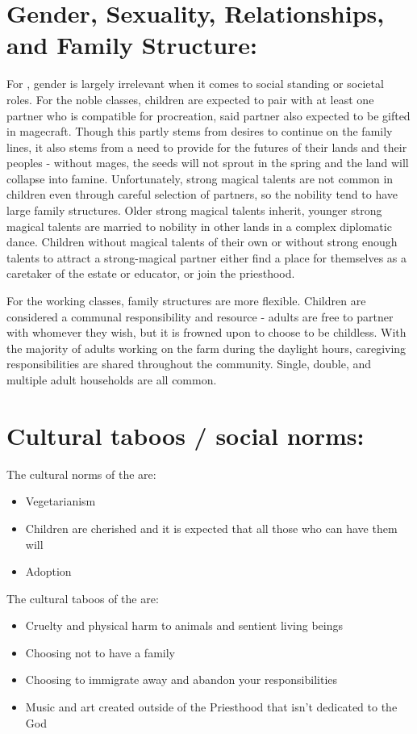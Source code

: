 \documentclass[blue]{GL2020}
\begin{document}
\section*{Gender, Sexuality, Relationships, and Family Structure:}

For \pFarm{}, gender is largely irrelevant when it comes to social standing or societal roles.  For the noble classes, children are expected to pair with at least one partner who is compatible for procreation, said partner also expected to be gifted in magecraft.  Though this partly stems from desires to continue on the family lines, it also stems from a need to provide for the futures of their lands and their peoples - without mages, the seeds will not sprout in the spring and the land will collapse into famine.  Unfortunately, strong magical talents are not common in children even through careful selection of partners, so the nobility tend to have large family structures.  Older strong magical talents inherit, younger strong magical talents are married to nobility in other lands in a complex diplomatic dance.  Children without magical talents of their own or without strong enough talents to attract a strong-magical partner either find a place for themselves as a caretaker of the estate or educator, or join the priesthood.

For the working classes, family structures are more flexible.  Children are considered a communal responsibility and resource - adults are free to partner with whomever they wish, but it is frowned upon to choose to be childless.  With the majority of adults working on the farm during the daylight hours, caregiving responsibilities are shared throughout the community.  Single, double, and multiple adult households are all common.       

\section*{Cultural taboos / social norms:}

The cultural norms of the \pFarm{} are:
\begin{itemize}
	\item Vegetarianism
	\item Children are cherished and it is expected that all those who can have them will
	\item Adoption
\end{itemize}

The cultural taboos of the \pFarm{} are:
\begin{itemize}
	\item Cruelty and physical harm to animals and sentient living beings
	\item Choosing not to have a family
	\item Choosing to immigrate away and abandon your responsibilities
	\item Music and art created outside of the Priesthood that isn't dedicated to the God
\end{itemize}
\end{document}

